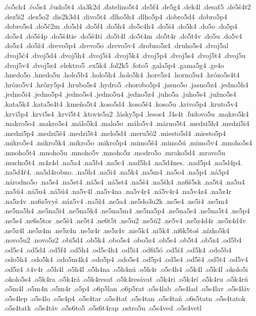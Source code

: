 {.\v co5ch4
.\v co5s4
.\v cudo5t4
.da3k2d
.\v datelino5t4
.de5f4
.de5g4
.dek4l
.desa\v t5
.de5\v s4t2
.dez5i2
.dez5o2
.dis2k3d4
.divo5t4
.dlho5h4
.dlho5p4
.dobro5d4
.dobro5p4
.dobro5s4
.do5\v c2m
.do5d4
.do5f4
.do5h4
.do5c4h4
.do5i4
.do5k4
.do5o
.do5p4
.do5s4
.do5\v s4p
.do5\v s4tie
.do5\v s4t\'i
.do5t4l
.do5t4m
.do5t4r
.do5t4v
.do5u
.do5v4
.do5z4
.do5\v z4
.drevo5p4
.drevo5o
.drevo5v4
.drobno5z4
.druho5s4
.dvoj5al
.dvoj5\v c4
.dvoj5d4
.dvoj5h4
.dvoj5i4
.dvoj5k4
.dvoj5p4
.dvoj5s4
.dvoj5t4
.dvoj5u
.dvoj5v4
.dvoj5z4
.elektro5
.ex5k4
.fol2k5
.foto5
.gala5p4
.gama5g4
.ge4o
.hnedo5o
.hnedo5u
.holo5b4
.holo5h4
.holo5k4
.hore5z4
.horno5u4
.hr\^ozo5s4t4
.hr\^ozo5v4
.hr\^ozy5p4
.hrubo5s4
.hydro5
.chorobo5p4
.jasno5o
.jasno5z4
.jedno5h4
.jedno5i4
.jedno5p4
.jedno5s4
.jedno5u4
.jedno5z4
.juho5a
.juho5s4
.ju\v zno5s4
.kata5k4
.kata5s4t4
.kme\v no5t4
.koso5d4
.koso5\v s4
.koso5u
.krivo5p4
.kruto5v4
.krvi5p4
.krvi5s4
.krvi5t4
.ktovie5a2
.l\'asky5p4
.lesos4
.\v l4s4t
.\v ludovo5u
.makro5k4
.makro5o4
.makro5s4
.m\'alo5k4
.malo5o
.m\'alo5v4
.m\'arno5t4
.medzi5h4
.medzi5i4
.medzi5p4
.medzi5\v s4
.medzi5t4
.melo5d4
.meru5\^o2
.miesto5d4
.miesto5p4
.mikro5e4
.mikro5k4
.mikro5o
.mikro5p4
.mimo5\v s4
.mimo5\'u
.mimo5v4
.mnoho5s4
.mnoho5t4
.mnoho5u
.mnoho5v
.mnoho5z
.modro5o
.mrako5d4
.mravo5u
.mucho5t4
.m4z4d
.na5a4
.na5b4
.na5c4
.nad5h4
.na5d4nes.
.nad5p4
.na5d4p4.
.na5d4\'r4.
.na5d4robno.
.na5h4
.na5i4
.na5k4
.na5m4
.na5o4
.na5p4
.n\'a5p4
.n\'arodno5o
.na5s4
.na5st4
.n\'a5s4
.n\'a5st4
.na5\v s4
.na5\v sk4
.na6\v s5sk
.na5t4
.na5u4
.na5\'u4
.n\'a5u4
.n\'a5\'u4
.na5v4l
.na5v4na
.na5v4r4
.n\'a5v4r4
.na5v4z4
.na5z4r
.na5z4v
.na6z5vy\v s
.n\'az5v4
.na5\v z4
.ne5a4
.ne5do3u2k
.ne5e4
.ne5i4
.ne5m4
.ne5na5h4
.ne5na5i4
.ne5na5k4
.ne5na5m4
.ne5na5p4
.ne5na5s4
.ne5na5t4
.ne5p4
.ne5s4
.ne6s5tor
.ne5\v s4
.ne5t4
.ne6t5t
.ne5u2
.ne5\'u2
.ne5v4
.ne5z4d4r
.ne5z4d4v
.ne5z4l
.ne5z4m
.ne5z4n
.ne5z4r
.ne5z4v
.nie5k4
.ni5k4
.ni6k5to\v s
.n\'izko5k4
.novo5u2
.novo5z2
.obi5d4
.ob5k4
.obo5s4
.obo5z4
.ob5s4
.ob5t4
.ob5z4
.od5b4
.od5c4
.od5d4
.od5f4
.od5h4
.od5c4h4
.od5i4
.od6i5\'o
.od5\'i4
.od5k4
.odo5b4
.odo5h4
.odo5k4
.odo5m4k4
.odo5p4
.odo5s4
.od5p4
.od5s4
.od5\v s4
.od5t4
.od5v4
.od5z4
.t4v4r
.o5h4l
.o5h4\v l
.o5h4na
.o5h4n\'u
.o5h4r
.o5c4h4
.o5k4l
.o5k4\v l
.okolo5i
.okolo5s4
.o5k4ra
.o5k4r\'a
.o5k4resa\v t
.o5k4res\'ava\v t
.o5k4ri
.o5k4r\'i
.o5k4ru
.o5k4r\'u
.o5m4l
.o5m4n
.o5m4r
.o5p4
.o6p5lan
.o6p5rat
.o5s4lab
.o5s4lad
.o5s4lav
.o5s4l\'av
.o5s4lep
.o5s4lo
.o5s4p4
.o5s4tar
.o5s4ta\v t
.o5s4tan
.o5s4ta\v n
.o6s5tatn
.o5s4tatok
.o5s4tatk
.o5s4t\'av
.o5s6to5
.o5s6t4rap
.ostro5u
.o5s4ved
.o5s4vetl
}
